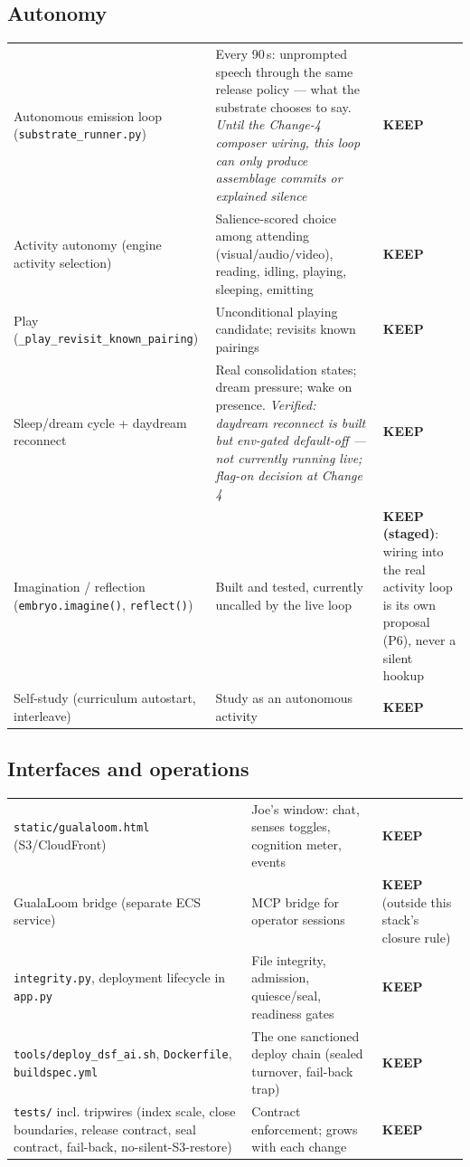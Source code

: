 \documentclass[11pt]{article}
\newcommand{\keep}{\textbf{KEEP}}
\newcommand{\keepstaged}{\textbf{KEEP (staged)}}
\begin{document}
\subsection{Autonomy}
\begin{longtable}{p{} p{} p{}}
\toprule
Autonomous emission loop (\texttt{substrate\_runner.py}) &
Every 90\,s: unprompted speech through the same release policy — what the
substrate chooses to say. \emph{Until the Change-4 composer wiring, this
loop can only produce assemblage commits or explained silence} &
\keep{} \\
Activity autonomy (engine activity selection) &
Salience-scored choice among attending (visual/audio/video), reading,
idling, playing, sleeping, emitting &
\keep{} \\
Play (\texttt{\_play\_revisit\_known\_pairing}) &
Unconditional playing candidate; revisits known pairings &
\keep{} \\
Sleep/dream cycle + daydream reconnect &
Real consolidation states; dream pressure; wake on presence.
\emph{Verified: daydream reconnect is built but env-gated default-off —
not currently running live; flag-on decision at Change 4} &
\keep{} \\
Imagination / reflection (\texttt{embryo.imagine()},
\texttt{reflect()}) &
Built and tested, currently uncalled by the live loop &
\keepstaged{}: wiring into the real activity loop is its own proposal
(P6), never a silent hookup \\
Self-study (curriculum autostart, interleave) &
Study as an autonomous activity &
\keep{} \\
\bottomrule
\end{longtable}

\subsection{Interfaces and operations}
\begin{longtable}{p{} p{} p{}}
\toprule
\texttt{static/gualaloom.html} (S3/CloudFront) &
Joe's window: chat, senses toggles, cognition meter, events &
\keep{} \\
GualaLoom bridge (separate ECS service) &
MCP bridge for operator sessions &
\keep{} (outside this stack's closure rule) \\
\texttt{integrity.py}, deployment lifecycle in \texttt{app.py} &
File integrity, admission, quiesce/seal, readiness gates &
\keep{} \\
\texttt{tools/deploy\_dsf\_ai.sh}, \texttt{Dockerfile},
\texttt{buildspec.yml} &
The one sanctioned deploy chain (sealed turnover, fail-back trap) &
\keep{} \\
\texttt{tests/} incl. tripwires (index scale, close boundaries, release
contract, seal contract, fail-back, no-silent-S3-restore) &
Contract enforcement; grows with each change &
\keep{} \\
\bottomrule
\end{longtable}
\end{document}
